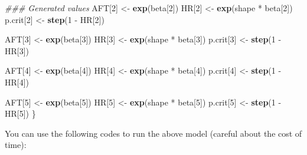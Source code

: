 \documentclass[]{tufte-handout}
\newenvironment{Shaded}{}{}
\newcommand{\CommentTok}[1]{\textcolor[rgb]{0.38,0.63,0.69}{\textit{#1}}}
\newcommand{\DecValTok}[1]{\textcolor[rgb]{0.25,0.63,0.44}{#1}}
\newcommand{\KeywordTok}[1]{\textcolor[rgb]{0.00,0.44,0.13}{\textbf{#1}}}
\newcommand{\NormalTok}[1]{#1}
\newcommand{\OperatorTok}[1]{\textcolor[rgb]{0.40,0.40,0.40}{#1}}
\newcommand{\StringTok}[1]{\textcolor[rgb]{0.25,0.44,0.63}{#1}}
\begin{document}
\begin{Shaded}
\begin{Highlighting}[]
  \CommentTok{### Generated values}
\NormalTok{  AFT[}\DecValTok{2}\NormalTok{] <-}\StringTok{ }\KeywordTok{exp}\NormalTok{(beta[}\DecValTok{2}\NormalTok{])}
\NormalTok{  HR[}\DecValTok{2}\NormalTok{] <-}\StringTok{ }\KeywordTok{exp}\NormalTok{(shape }\OperatorTok{*}\StringTok{ }\NormalTok{beta[}\DecValTok{2}\NormalTok{])}
\NormalTok{  p.crit[}\DecValTok{2}\NormalTok{] <-}\StringTok{ }\KeywordTok{step}\NormalTok{(}\DecValTok{1} \OperatorTok{-}\StringTok{ }\NormalTok{HR[}\DecValTok{2}\NormalTok{])}
  
\NormalTok{  AFT[}\DecValTok{3}\NormalTok{] <-}\StringTok{ }\KeywordTok{exp}\NormalTok{(beta[}\DecValTok{3}\NormalTok{])}
\NormalTok{  HR[}\DecValTok{3}\NormalTok{] <-}\StringTok{ }\KeywordTok{exp}\NormalTok{(shape }\OperatorTok{*}\StringTok{ }\NormalTok{beta[}\DecValTok{3}\NormalTok{])}
\NormalTok{  p.crit[}\DecValTok{3}\NormalTok{] <-}\StringTok{ }\KeywordTok{step}\NormalTok{(}\DecValTok{1} \OperatorTok{-}\StringTok{ }\NormalTok{HR[}\DecValTok{3}\NormalTok{])}
  
\NormalTok{  AFT[}\DecValTok{4}\NormalTok{] <-}\StringTok{ }\KeywordTok{exp}\NormalTok{(beta[}\DecValTok{4}\NormalTok{])}
\NormalTok{  HR[}\DecValTok{4}\NormalTok{] <-}\StringTok{ }\KeywordTok{exp}\NormalTok{(shape }\OperatorTok{*}\StringTok{ }\NormalTok{beta[}\DecValTok{4}\NormalTok{])}
\NormalTok{  p.crit[}\DecValTok{4}\NormalTok{] <-}\StringTok{ }\KeywordTok{step}\NormalTok{(}\DecValTok{1} \OperatorTok{-}\StringTok{ }\NormalTok{HR[}\DecValTok{4}\NormalTok{])}
  
\NormalTok{  AFT[}\DecValTok{5}\NormalTok{] <-}\StringTok{ }\KeywordTok{exp}\NormalTok{(beta[}\DecValTok{5}\NormalTok{])}
\NormalTok{  HR[}\DecValTok{5}\NormalTok{] <-}\StringTok{ }\KeywordTok{exp}\NormalTok{(shape }\OperatorTok{*}\StringTok{ }\NormalTok{beta[}\DecValTok{5}\NormalTok{])}
\NormalTok{  p.crit[}\DecValTok{5}\NormalTok{] <-}\StringTok{ }\KeywordTok{step}\NormalTok{(}\DecValTok{1} \OperatorTok{-}\StringTok{ }\NormalTok{HR[}\DecValTok{5}\NormalTok{])}
\NormalTok{\}}
\end{Highlighting}
\end{Shaded}

You can use the following codes to run the above model (careful about
the cost of time):
\end{document}
